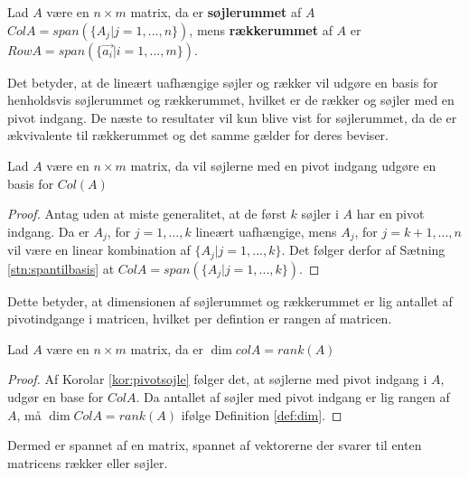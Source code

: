 \begin{defn}
Lad $A$ være en $n\times m$ matrix, da er \textbf{søjlerummet} af $A$ $Col A = span(\{A_j | j =1,...,n\})$, mens \textbf{rækkerummet} af $A$ er $Row A = span(\{\vec{a_i}|i=1,...,m\})$.
\label{def:sojlerum}
\end{defn} 
Det betyder, at de lineært uafhængige søjler og rækker vil udgøre en basis for henholdsvis søjlerummet og rækkerummet, hvilket er de rækker og søjler med en pivot indgang. 
De næste to resultater vil kun blive vist for søjlerummet, da de er ækvivalente til rækkerummet og det samme gælder for deres beviser.
\begin{kor}
Lad $A$ være en $n \times m$ matrix, da vil søjlerne med en pivot indgang udgøre en basis for $Col (A)$
\label{kor:pivotsojle}
\end{kor}
\begin{proof}
Antag uden at miste generalitet, at de først $k$ søjler i $A$ har en pivot indgang.
Da er $A_j$, for $j=1,...,k$ lineært uafhængige, mens $A_j$, for $j = k+1,...,n$ vil være en linear kombination af $\{A_j | j = 1,...,k\}$. 
Det følger derfor af Sætning \ref{stn:spantilbasis} at $Col A = span(\{A_j| j=1,...,k\})$.
\end{proof}
Dette betyder, at dimensionen af søjlerummet og rækkerummet er lig antallet af pivotindgange i matricen, hvilket per defintion er rangen af matricen.
\begin{kor}
Lad $A$ være en $n\times m $ matrix, da er $\dim{col A} = rank (A)$
\end{kor}
\begin{proof}
Af Korolar \ref{kor:pivotsojle} følger det, at søjlerne med pivot indgang i $A$, udgør en base for $Col A$. 
Da antallet af søjler med pivot indgang er lig rangen af $A$, må $\dim{Col A} = rank (A)$ ifølge Definition \ref{def:dim}.
\end{proof}
Dermed er spannet af en matrix, spannet af vektorerne der svarer til enten matricens rækker eller søjler.

